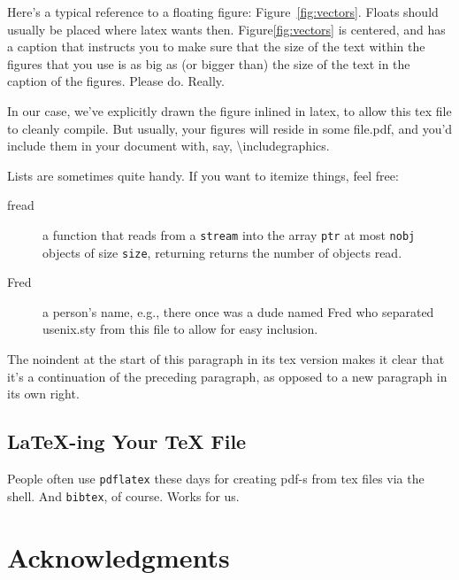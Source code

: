 Here's a typical reference to a floating figure: Figure~\ref{fig:vectors}. Floats should usually be placed where latex wants then. Figure\ref{fig:vectors} is centered, and has a caption that instructs you to make sure that the size of the text within the figures that you use is as big as (or bigger than) the size of the text in the caption of the figures. Please do. Really.\par

In our case, we've explicitly drawn the figure inlined in latex, to allow this tex file to cleanly compile. But usually, your figures will reside in some file.pdf, and you'd include them in your document with, say, \textbackslash{}includegraphics.\par

Lists are sometimes quite handy. If you want to itemize things, feel free:\par

\begin{description}

    \item[fread] a function that reads from a \texttt{stream} into the array \texttt{ptr} at most \texttt{nobj} objects of size \texttt{size}, returning returns the number of objects read.

    \item[Fred] a person's name, e.g., there once was a dude named Fred who separated usenix.sty from this file to allow for easy inclusion.
\end{description}

\noindent
The noindent at the start of this paragraph in its tex version makes it clear that it's a continuation of the preceding paragraph, as opposed to a new paragraph in its own right.\par


\subsection{LaTeX-ing Your TeX File}

People often use \texttt{pdflatex} these days for creating pdf-s from tex files via the shell. And \texttt{bibtex}, of course. Works for us.\par

\section*{Acknowledgments}

